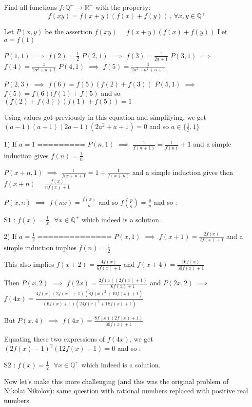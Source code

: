 \begin{solution}
	\begin{tcolorbox}Find all functions $f: \mathbb{Q}^+ \to \mathbb{R}^+ $ with the property:
\[f(xy)=f(x+y)(f(x)+f(y)) \,,\, \forall x,y \in \mathbb{Q}^+\]\end{tcolorbox}
Let $P(x,y)$ be the assertion $f(xy)=f(x+y)(f(x)+f(y))$
Let $a=f(1)$

$P(1,1)$ $\implies$ $f(2)=\frac 12$
$P(2,1)$ $\implies$ $f(3)=\frac 1{2a+1}$
$P(3,1)$ $\implies$ $f(4)=\frac 1{2a^2+a+1}$
$P(4,1)$ $\implies$ $f(5)=\frac 1{2a^3+a^2+a+1}$

$P(2,3)$ $\implies$ $f(6)=f(5)(f(2)+f(3))$
$P(5,1)$ $\implies$ $f(5)=f(6)(f(1)+f(5)$ and so $(f(2)+f(3))(f(1)+f(5))=1$

Using values got previously in this equation and simplifying, we get $(a-1)(a+1)(2a-1)(2a^2+a+1)=0$ and so $a\in\{\frac 12,1\}$

1) If $a=1$
=========
$P(n,1)$ $\implies$ $\frac 1{f(n+1)}=\frac 1{f(n)}+1$ and a simple induction gives $f(n)=\frac 1n$

$P(x+n,1)$ $\implies$ $\frac 1{f(x+n+1}=1+\frac 1{f(x+n)}$ and a simple induction gives then $f(x+n)=\frac{f(x)}{nf(x)+1}$

$P(x,n)$ $\implies$ $f(nx)=\frac{f(x)}n$ and so $f(\frac pq)=\frac qp$ and so :

$\boxed{\text{S1 : }f(x)=\frac 1x\text{  }\forall x\in\mathbb Q^+}$ which indeed is a solution.


2) If $a=\frac 12$
==============
$P(x,1)$ $\implies$ $f(x+1)=\frac{2f(x)}{2f(x)+1}$ and a simple induction implies $f(n)=\frac 12$

This also implies $f(x+2)=\frac {4f(x)}{6f(x)+1}$ and $f(x+4)=\frac{16f(x)}{30f(x)+1}$

Then $P(x,2)$ $\implies$ $f(2x)=\frac{2f(x)(2f(x)+1)}{6f(x)+1}$ and $P(2x,2)$ $\implies$ $f(4x)=\frac{4f(x)(2f(x)+1)(8f(x)^2+10f(x)+1)}{(6f(x)+1)(24f(x)^2+18f(x)+1)}$

But $P(x,4)$ $\implies$ $f(4x)=\frac{8f(x)(2f(x)+1)}{30f(x)+1}$

Equating these two expressions of $f(4x)$, we get $(2f(x)-1)^2(12f(x)+1)=0$ and so :

$\boxed{\text{S2 : }f(x)=\frac 12\text{  }\forall x\in\mathbb Q^+}$ which indeed is a solution.
\end{solution}



\begin{solution}
	Now let's make this more challenging (and this was the original problem of Nikolai Nikolov): same question with rational numbers replaced with positive real numbers.
\end{solution}



